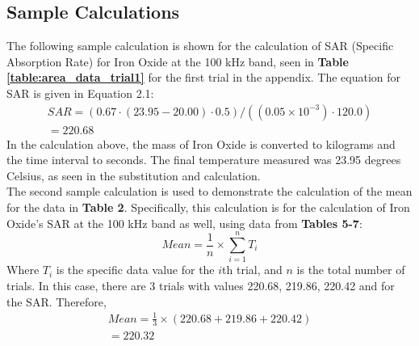 \documentclass[12pt]{article}
\numberwithin{equation}{section}
\numberwithin{equation}{section}
\begin{document}
\subsection{Sample Calculations}
{The following sample calculation is shown for the calculation of SAR (Specific Absorption Rate) for Iron Oxide at the 100 kHz band, seen in} \textbf{Table \ref{table:area_data_trial1}} for the first trial {in the appendix. The equation for SAR is given in Equation 2.1:}
\begin{gather*}
    SAR = (0.67 \cdot ( 23.95 - 20.00) \cdot 0.5) / ((0.05 \times 10 ^{-3}) \cdot 120.0)\\
    = 220.68
\end{gather*}
In the calculation above, the mass of Iron Oxide is converted to kilograms and the time interval to seconds. The final temperature measured was 23.95 degrees Celsius, as seen in the substitution and calculation.\\
{The second sample calculation is used to demonstrate the calculation of the mean for the data in \textbf{Table 2}. Specifically, this calculation is for the calculation of Iron Oxide's SAR at the 100 kHz band as well, using data from \textbf{Tables 5-7}}:
\begin{equation}
    Mean = \frac{1}{n} \times \sum_{i=1}^n T_i
\end{equation}
{Where $T_i$ is the specific data value for the $i$th trial, and $n$ is the total number of trials. In this case, there are 3 trials with values 220.68, 219.86, 220.42 and for the SAR. Therefore,}
\begin{gather*}
   Mean = \frac{1}{3} \times (220.68 + 219.86 + 220.42)\\
   = 220.32
\end{gather*}
\end{document}
